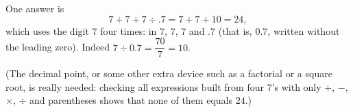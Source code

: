 One answer is
\[
7+7+7\div .7=7+7+10=\boxed{24},
\]
which uses the digit $7$ four times: in $7$, $7$, $7$ and $.7$ (that is, $0.7$, written without the leading zero). Indeed $7\div0.7=\dfrac{70}{7}=10$.

(The decimal point, or some other extra device such as a factorial or a square root, is really needed: checking all expressions built from four $7$'s with only $+$, $-$, $\times$, $\div$ and parentheses shows that none of them equals $24$.)
